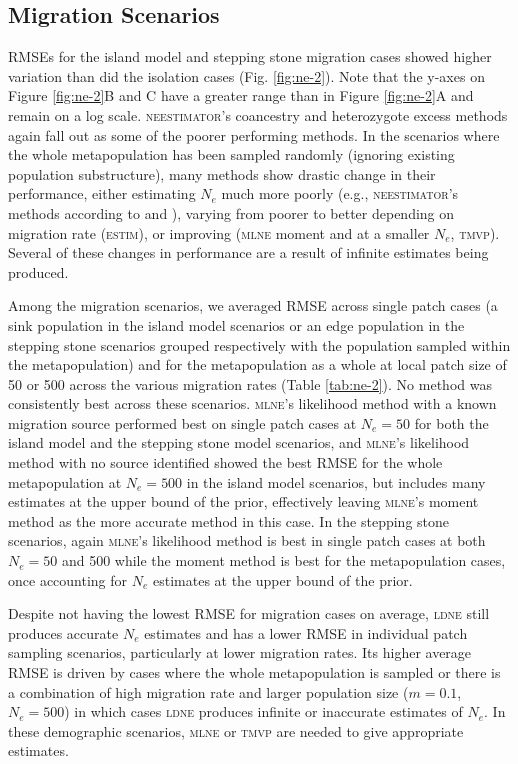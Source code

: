 \subsection{Migration Scenarios}
RMSEs for the island model and stepping stone migration cases showed higher variation than did 
the isolation cases (Fig. \ref{fig:ne-2}). Note that the y-axes on Figure \ref{fig:ne-2}B and C have a greater range than 
in Figure \ref{fig:ne-2}A and remain on a log scale. \textsc{neestimator}'s coancestry and heterozygote excess 
methods again fall out as some of the poorer performing methods. In the scenarios where the whole 
metapopulation has been sampled randomly (ignoring existing population substructure), many methods 
show drastic change in their performance, either estimating $N_e$ much more poorly (e.g., 
\textsc{neestimator}'s methods according to \citet{Pollak:1983} and \citet{Nei:1981}), varying from 
poorer to better depending on migration rate (\textsc{estim}), or improving (\textsc{mlne} moment and at a 
smaller $N_e$, \textsc{tmvp}). Several of these changes in performance are a result of 
infinite estimates being produced.

Among the migration scenarios, we averaged RMSE across single patch cases (a sink population in 
the island model scenarios or an edge population in the stepping stone scenarios grouped respectively 
with the population sampled within the metapopulation) and for the metapopulation as a whole at local 
patch size of 50 or 500 across the various migration rates (Table \ref{tab:ne-2}). No method was consistently 
best across these scenarios. \textsc{mlne}'s likelihood method with a known migration source performed 
best on single patch cases at $N_e = 50$ for both the island model and the
stepping stone model scenarios, and \textsc{mlne}'s likelihood method with no source identified 
showed the best RMSE for the whole metapopulation at $N_e = 500$ in the island model 
scenarios, but includes many estimates at the upper bound of the prior, effectively leaving 
\textsc{mlne}'s moment method as the more accurate method in this case. In the stepping stone scenarios, 
again \textsc{mlne}'s likelihood method is best in single patch cases at both $N_e = 50$ and 500 
while the moment method is best for the metapopulation cases, once accounting for $N_e$ estimates 
at the upper bound of the prior.

Despite not having the lowest RMSE for migration cases on average, \textsc{ldne} still produces 
accurate $N_e$ estimates and has a lower RMSE in individual patch sampling scenarios, particularly 
at lower migration rates. Its higher average RMSE is driven by cases where the whole metapopulation is 
sampled or there is a combination of high migration rate and larger population size ($m = 0.1$, $N_e = 500$) 
in which cases \textsc{ldne} produces infinite or inaccurate estimates of $N_e$. In these demographic 
scenarios, \textsc{mlne} or \textsc{tmvp} are needed to give appropriate estimates.

